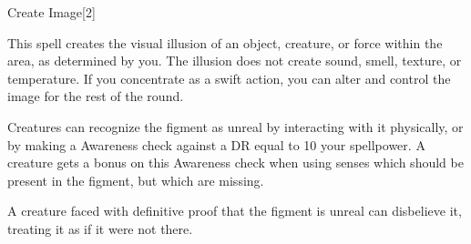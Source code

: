 \begin{spellsection}{Create Image}[2]
    \begin{spellheader}
    \end{spellheader}
    \begin{spellcontent}
        \begin{spelltargetinginfo}
        \end{spelltargetinginfo}
        \begin{spelleffects}
            \spelleffect This spell creates the visual illusion of an object, creature, or force within the area, as determined by you. The illusion does not create sound, smell, texture, or temperature. If you concentrate as a swift action, you can alter and control the image for the rest of the round.
            \spelldur \durshort
        \end{spelleffects}
    \end{spellcontent}
    \begin{spellfooter}
        \spellnotes Creatures can recognize the figment as unreal by interacting with it physically, or by making a Awareness check against a DR equal to 10 \add your spellpower. A creature gets a  bonus on this Awareness check when using senses which should be present in the figment, but which are missing.

        A creature faced with definitive proof that the figment is unreal can disbelieve it, treating it as if it were not there.
        \miscastexplode
    \end{spellfooter}
    \begin{spellaugments}
    \end{spellaugments}
\end{spellsection}

